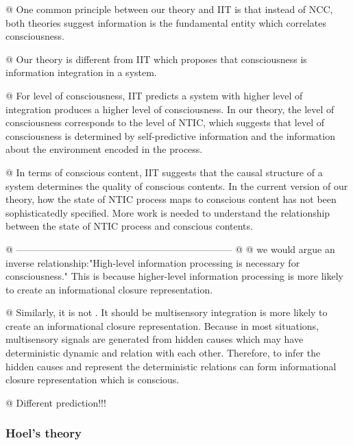 \documentclass[utf8]{article}
\begin{document}
		
			\begin{ants}
			
			@ One common principle between our theory and IIT is that instead of NCC, both theories suggest information is the fundamental entity which correlates consciousness. 
			
			@ Our theory is different from IIT which proposes that consciousness is information integration in a system.
			
			@ For level of consciousness, IIT predicts a system with higher level of integration produces a higher level of consciousness. In our theory, the level of consciousness corresponds to the level of NTIC, which suggests that level of consciousness is determined by self-predictive information and the information about the environment encoded in the process.
			
			@ In terms of conscious content, IIT suggests that the causal structure of a system determines the quality of conscious contents. In the current version of our theory, how the state of NTIC process maps to conscious content has not been sophisticatedly specified. More work is needed to understand the relationship between the state of NTIC process and conscious contents.
		
		    @ --------------------------------------------------------------------
			@ \cite{Mudrik_Faivre_Koch}
			@ \cite{Mudrik_Faivre_Koch} we would argue an inverse relationship:"High-level information processing is necessary for consciousness." This is because higher-level information processing is more likely to create an informational closure representation.

			@ Similarly, it is not . It should be multisensory integration is more likely to create an informational closure representation. Because in most situations, multisensory signals are generated from hidden causes which may have deterministic dynamic and relation with each other. Therefore, to infer the hidden causes and represent the deterministic relations can form informational closure representation which is conscious.
			
			@ Different prediction!!!

			\end{ants}


			\subsubsection{Hoel's theory}
\end{document}

